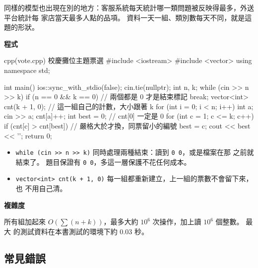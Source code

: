 同樣的模型也出現在別的地方：客服系統每天統計哪一類問題被反映得最多，外送平台統計每
家店當天最多人點的品項。 資料一天一組、類別數每天不同，就是這題的形狀。

\textbf{程式}

\begin{example}[label=ex:vote]{cpp}{(vote.cpp) 校慶攤位主題票選}
#include <iostream>
#include <vector>
using namespace std;

int main() {
    ios::sync_with_stdio(false);
    cin.tie(nullptr);
    int n, k;
    while (cin >> n >> k) {
        if (n == 0 && k == 0) {           // 兩個都是 0 才是結束標記
            break;
        }
        vector<int> cnt(k + 1, 0);        // 這一組自己的計數，大小跟著 k
        for (int i = 0; i < n; i++) {
            int a;
            cin >> a;
            cnt[a]++;
        }
        int best = 0;                     // cnt[0] 一定是 0
        for (int c = 1; c <= k; c++) {
            if (cnt[c] > cnt[best]) {     // 嚴格大於才換，同票留小的編號
                best = c;
            }
        }
        cout << best << '\n';
    }
    return 0;
}
\end{example}


\begin{itemize}
\item \texttt{while (cin >> n >> k)} 同時處理兩種結束：讀到 \texttt{0 0}，或是檔案在那
之前就結束了。 題目保證有 \texttt{0 0}，多這一層保護不花任何成本。
\item \texttt{vector<int> cnt(k + 1, 0)} 每一組都重新建立，上一組的票數不會留下來，也
不用自己清。
\end{itemize}

\textbf{複雜度}

所有組加起來 $O(\sum (n + k))$，最多大約 $10^6$ 次操作，加上讀 $10^6$ 個整數。 最大
的測試資料在本書測試的環境下約 $0.03$ 秒。

\subsection{常見錯誤}


